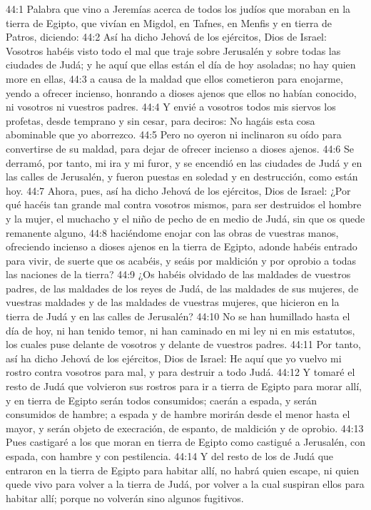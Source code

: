 44:1 Palabra que vino a Jeremías acerca de todos los judíos que moraban en la tierra de Egipto, que vivían en Migdol, en Tafnes, en Menfis y en tierra de Patros, diciendo: 
44:2 Así ha dicho Jehová de los ejércitos, Dios de Israel: Vosotros habéis visto todo el mal que traje sobre Jerusalén y sobre todas las ciudades de Judá; y he aquí que ellas están el día de hoy asoladas; no hay quien more en ellas, 
44:3 a causa de la maldad que ellos cometieron para enojarme, yendo a ofrecer incienso, honrando a dioses ajenos que ellos no habían conocido, ni vosotros ni vuestros padres. 
44:4 Y envié a vosotros todos mis siervos los profetas, desde temprano y sin cesar, para deciros: No hagáis esta cosa abominable que yo aborrezco. 
44:5 Pero no oyeron ni inclinaron su oído para convertirse de su maldad, para dejar de ofrecer incienso a dioses ajenos. 
44:6 Se derramó, por tanto, mi ira y mi furor, y se encendió en las ciudades de Judá y en las calles de Jerusalén, y fueron puestas en soledad y en destrucción, como están hoy. 
44:7 Ahora, pues, así ha dicho Jehová de los ejércitos, Dios de Israel: ¿Por qué hacéis tan grande mal contra vosotros mismos, para ser destruidos el hombre y la mujer, el muchacho y el niño de pecho de en medio de Judá, sin que os quede remanente alguno, 
44:8 haciéndome enojar con las obras de vuestras manos, ofreciendo incienso a dioses ajenos en la tierra de Egipto, adonde habéis entrado para vivir, de suerte que os acabéis, y seáis por maldición y por oprobio a todas las naciones de la tierra? 
44:9 ¿Os habéis olvidado de las maldades de vuestros padres, de las maldades de los reyes de Judá, de las maldades de sus mujeres, de vuestras maldades y de las maldades de vuestras mujeres, que hicieron en la tierra de Judá y en las calles de Jerusalén? 
44:10 No se han humillado hasta el día de hoy, ni han tenido temor, ni han caminado en mi ley ni en mis estatutos, los cuales puse delante de vosotros y delante de vuestros padres. 
44:11 Por tanto, así ha dicho Jehová de los ejércitos, Dios de Israel: He aquí que yo vuelvo mi rostro contra vosotros para mal, y para destruir a todo Judá. 
44:12 Y tomaré el resto de Judá que volvieron sus rostros para ir a tierra de Egipto para morar allí, y en tierra de Egipto serán todos consumidos; caerán a espada, y serán consumidos de hambre; a espada y de hambre morirán desde el menor hasta el mayor, y serán objeto de execración, de espanto, de maldición y de oprobio. 
44:13 Pues castigaré a los que moran en tierra de Egipto como castigué a Jerusalén, con espada, con hambre y con pestilencia. 
44:14 Y del resto de los de Judá que entraron en la tierra de Egipto para habitar allí, no habrá quien escape, ni quien quede vivo para volver a la tierra de Judá, por volver a la cual suspiran ellos para habitar allí; porque no volverán sino algunos fugitivos. 
